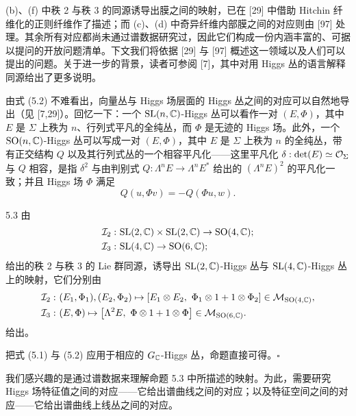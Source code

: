 
(b)、(f) 中秩 2 与秩 3 的同源诱导出膜之间的映射，已在 [29] 中借助 Hitchin 纤维化的正则纤维作了描述；而 (c)、(d) 中奇异纤维内部膜之间的对应则由 [97] 处理。其余所有对应都尚未通过谱数据研究过，因此它们构成一份内涵丰富的、可据以提问的开放问题清单。下文我们将依据 [29] 与 [97] 概述这一领域以及人们可以提出的问题。关于进一步的背景，读者可参阅 [7]，其中对用 Higgs 丛的语言解释同源给出了更多说明。

由式 (5.2) 不难看出，向量丛与 Higgs 场层面的 Higgs 丛之间的对应可以自然地导出（见 [7,29]）。回忆一下：一个 $\mathrm{SL}(n,\mathbb{C})$-Higgs 丛可以看作一对 $(E,\Phi)$，其中 $E$ 是 $\Sigma$ 上秩为 $n$、行列式平凡的全纯丛，而 $\Phi$ 是无迹的 Higgs 场。此外，一个 $\mathrm{SO}(n,\mathbb{C})$-Higgs 丛可以写成一对 $(E,\Phi)$，其中 $E$ 是 $\Sigma$ 上秩为 $n$ 的全纯丛，带有正交结构 $Q$ 以及其行列式丛的一个相容平凡化——这里平凡化 $\delta : \det(E)\simeq\mathcal{O}_{\Sigma}$ 与 $Q$ 相容，是指 $\delta^2$ 与由判别式 $Q : \Lambda^n E\to\Lambda^n E^*$ 给出的 $(\Lambda^n E)^2$ 的平凡化一致；并且 Higgs 场 $\Phi$ 满足
\[
Q(u,\Phi v) = -Q(\Phi u, w).
\]


\begin{prop}{5.3}
由
\begin{align*}
\mathcal{I}_2 :\ &\mathrm{SL}(2,\mathbb{C})\times\mathrm{SL}(2,\mathbb{C})\to\mathrm{SO}(4,\mathbb{C});\\
\mathcal{I}_3 :\ &\mathrm{SL}(4,\mathbb{C})\to\mathrm{SO}(6,\mathbb{C});
\end{align*}
给出的秩 2 与秩 3 的 Lie 群同源，诱导出 $\mathrm{SL}(2,\mathbb{C})$-Higgs 丛与 $\mathrm{SL}(4,\mathbb{C})$-Higgs 丛上的映射，它们分别由
\begin{align*}
\cI_2 :\ &(E_1,\Phi_1),(E_2,\Phi_2)\mapsto[E_1\otimes E_2,\ \Phi_1\otimes 1+1\otimes\Phi_2]\in\cM_{\SO(4,\C)},\\
\cI_3 :\ &(E,\Phi)\mapsto\bigl[\Lambda^2 E,\ \Phi\otimes 1+1\otimes\Phi\bigr]\in\cM_{\SO(6,\C)}.
\end{align*}
给出。
\end{prop}

把式 (5.1) 与 (5.2) 应用于相应的 $G_{\mathbb{C}}$-Higgs 丛，命题直接可得。\hfill$\square$

我们感兴趣的是通过谱数据来理解命题 5.3 中所描述的映射。为此，需要研究 Higgs 场特征值之间的对应——它给出谱曲线之间的对应；以及特征空间之间的对应——它给出谱曲线上线丛之间的对应。
